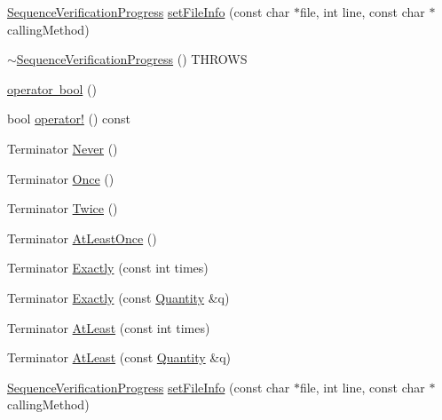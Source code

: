 \begin{DoxyCompactItemize}
\mbox{\hyperlink{classfakeit_1_1SequenceVerificationProgress}{Sequence\+Verification\+Progress}} \mbox{\hyperlink{classfakeit_1_1SequenceVerificationProgress_aeeadb72fd4e0f52c06fa28c6b54d8188}{set\+File\+Info}} (const char $\ast$file, int line, const char $\ast$calling\+Method)
\item 
\mbox{\hyperlink{classfakeit_1_1SequenceVerificationProgress_a2c3325aa3d50002ef448d31e21494f76}{$\sim$\+Sequence\+Verification\+Progress}} () T\+H\+R\+O\+WS
\item 
\mbox{\hyperlink{classfakeit_1_1SequenceVerificationProgress_a462f6bec1f00814e918f9be6bd5f84e6}{operator bool}} ()
\item 
bool \mbox{\hyperlink{classfakeit_1_1SequenceVerificationProgress_a43f9268650854f97cbae3b28487c2be0}{operator!}} () const
\item 
Terminator \mbox{\hyperlink{classfakeit_1_1SequenceVerificationProgress_ad71678d34cb297945ecad2e1fe825f31}{Never}} ()
\item 
Terminator \mbox{\hyperlink{classfakeit_1_1SequenceVerificationProgress_a4a3260eb1380fcee1c0d8ae162ea57f4}{Once}} ()
\item 
Terminator \mbox{\hyperlink{classfakeit_1_1SequenceVerificationProgress_ac453e14db60c17c23748cc5f4f2325ca}{Twice}} ()
\item 
Terminator \mbox{\hyperlink{classfakeit_1_1SequenceVerificationProgress_a682eed8897bda26aa2927f0a0b03f0b1}{At\+Least\+Once}} ()
\item 
Terminator \mbox{\hyperlink{classfakeit_1_1SequenceVerificationProgress_a74c04958c69e3c977ce873de3787305d}{Exactly}} (const int times)
\item 
Terminator \mbox{\hyperlink{classfakeit_1_1SequenceVerificationProgress_abb39ac5b5e16e07b1caaf01325228c47}{Exactly}} (const \mbox{\hyperlink{structfakeit_1_1Quantity}{Quantity}} \&q)
\item 
Terminator \mbox{\hyperlink{classfakeit_1_1SequenceVerificationProgress_a83ba8d481bb79dad783f9bc821dd650e}{At\+Least}} (const int times)
\item 
Terminator \mbox{\hyperlink{classfakeit_1_1SequenceVerificationProgress_a1f6e949249d3f8119e920f6df6f7ade2}{At\+Least}} (const \mbox{\hyperlink{structfakeit_1_1Quantity}{Quantity}} \&q)
\item 
\mbox{\hyperlink{classfakeit_1_1SequenceVerificationProgress}{Sequence\+Verification\+Progress}} \mbox{\hyperlink{classfakeit_1_1SequenceVerificationProgress_aeeadb72fd4e0f52c06fa28c6b54d8188}{set\+File\+Info}} (const char $\ast$file, int line, const char $\ast$calling\+Method)

\end{DoxyCompactItemize}

